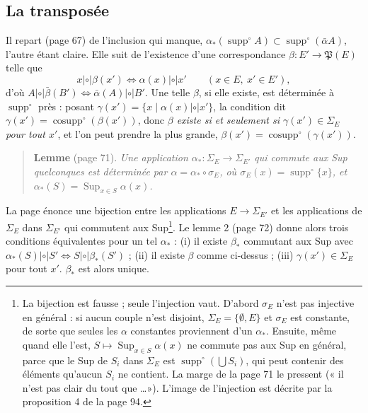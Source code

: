 \documentclass[11pt,a4paper]{article}
\begin{document}
\subsection*{La transposée}

Il repart (page 67) de l'inclusion qui manque,
$\alpha_{*}(\operatorname{supp}^{\circ} A) \subset
\operatorname{supp}^{\circ}(\bar\alpha A)$, l'autre étant claire. Elle suit de
l'existence d'une correspondance $\beta : E' \to \mathfrak{P}(E)$ telle que
\[
x \mathrel{|\circ|} \beta(x') \iff \alpha(x) \mathrel{|\circ|} x' \qquad (x \in E,
\ x' \in E'),
\]
d'où $A \mathrel{|\circ|} \bar\beta(B') \iff \bar\alpha(A) \mathrel{|\circ|} B'$.
Une telle $\beta$, si elle existe, est déterminée à $\operatorname{supp}^{\circ}$
près : posant $\gamma(x') = \{ x \mid \alpha(x) \mathrel{|\circ|} x'\}$, la
condition dit $\gamma(x') = \operatorname{cosupp}^{\circ}(\beta(x'))$, donc
\emph{$\beta$ existe si et seulement si $\gamma(x') \in \Sigma_{E}$ pour tout
$x'$}, et l'on peut prendre la plus grande, $\beta(x') =
\operatorname{cosupp}^{\circ}(\gamma(x'))$. 
\begin{quote}
\textbf{Lemme} (page 71). \emph{Une application $\alpha_{*} : \Sigma_{E} \to
\Sigma_{E'}$ qui commute aux Sup quelconques est déterminée par $\alpha =
\alpha_{*} \circ \sigma_{E}$, où $\sigma_{E}(x) = \operatorname{supp}^{\circ}\{x\}$,
et $\alpha_{*}(S) = \operatorname{Sup}_{x \in S} \alpha(x)$.}
\end{quote}

La page énonce une bijection entre les applications $E \to \Sigma_{E'}$ et les
applications de $\Sigma_{E}$ dans $\Sigma_{E'}$ qui commutent aux Sup\footnote{La
bijection est fausse ; seule l'injection vaut. D'abord $\sigma_{E}$ n'est pas
injective en général : si aucun couple n'est disjoint, $\Sigma_{E} = \{\emptyset,
E\}$ et $\sigma_{E}$ est constante, de sorte que seules les $\alpha$ constantes
proviennent d'un $\alpha_{*}$. Ensuite, même quand elle l'est, $S \mapsto
\operatorname{Sup}_{x \in S}\alpha(x)$ ne commute pas aux Sup en général, parce
que le Sup de $S_{i}$ dans $\Sigma_{E}$ est
$\operatorname{supp}^{\circ}(\bigcup S_{i})$, qui peut contenir des éléments
qu'aucun $S_{i}$ ne contient. La marge de la page 71 le pressent (« il n'est pas
clair du tout que \ldots »). L'image de l'injection est décrite par la
proposition 4 de la page 94.}. Le lemme 2 (page 72) donne alors trois conditions
équivalentes pour un tel $\alpha_{*}$ : (i) il existe $\beta_{*}$ commutant aux
Sup avec $\alpha_{*}(S) \mathrel{|\circ|} S' \iff S \mathrel{|\circ|}
\beta_{*}(S')$ ; (ii) il existe $\beta$ comme ci-dessus ; (iii) $\gamma(x') \in
\Sigma_{E}$ pour tout $x'$. $\beta_{*}$ est alors unique.
\end{document}
